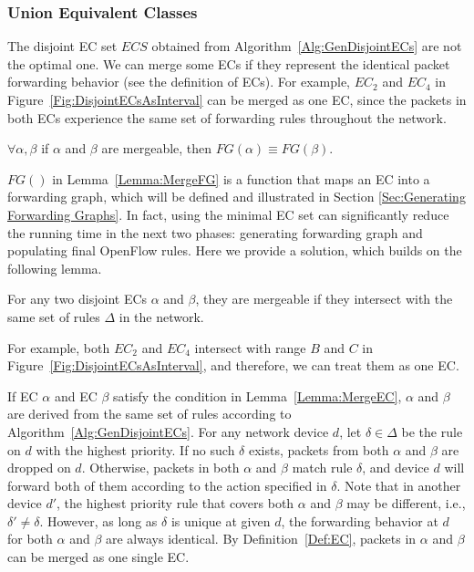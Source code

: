\subsubsection{Union Equivalent Classes}
The disjoint EC set $ECS$ obtained from Algorithm~\ref{Alg:GenDisjointECs} are not the optimal one. 
We can merge some ECs if they represent the identical packet forwarding behavior (see the definition of ECs). 
For example, $EC_2$ and $EC_4$ in Figure~\ref{Fig:DisjointECsAsInterval} can be merged as one EC, since the packets in both ECs experience the same set of forwarding rules throughout the network. %

\begin{lemma}
$\forall \alpha, \beta $ if $\alpha$ and $\beta$ are mergeable, then $FG(\alpha) \equiv FG(\beta)$.
\label{Lemma:MergeFG}
\end{lemma}
$FG()$ in Lemma~\ref{Lemma:MergeFG} is a function that maps an EC into a forwarding graph, which will be defined and illustrated in Section \ref{Sec:Generating Forwarding Graphs}. In fact, using the minimal EC set can significantly reduce the running time in the next two phases: generating forwarding graph and populating final OpenFlow rules. Here we provide a solution, which builds on the following lemma.

\begin{lemma}
For any two disjoint ECs $\alpha$ and $\beta$, they are mergeable
if they intersect with the same set of rules $\Delta$ in the network.
\label{Lemma:MergeEC}
\end{lemma}
For example, both $EC_2$ and $EC_4$ intersect with range $B$ and $C$ in Figure~\ref{Fig:DisjointECsAsInterval}, and therefore, we can treat them as one EC.

If EC $\alpha$ and EC $\beta$ satisfy the condition in Lemma~\ref{Lemma:MergeEC},
$\alpha$ and $\beta$ are derived from the same set of rules according to Algorithm~\ref{Alg:GenDisjointECs}.
For any network device $d$, let $\delta \in \Delta$ be the rule on $d$ with the highest priority.
If no such $\delta$ exists, packets from both $\alpha$ and $\beta$ are dropped on $d$.
Otherwise, packets in both $\alpha$ and $\beta$ match rule $\delta$, and
device $d$ will forward both of them according to the action specified in $\delta$.
Note that in another device $d'$, the highest priority rule that covers both $\alpha$
and $\beta$ may be different, i.e., $\delta' \neq \delta$.
However, as long as $\delta$ is unique at given $d$, the forwarding behavior at $d$ for both $\alpha$ and $\beta$ are always identical.
By Definition~\ref{Def:EC}, packets in $\alpha$ and $\beta$ can be merged as one single EC.

